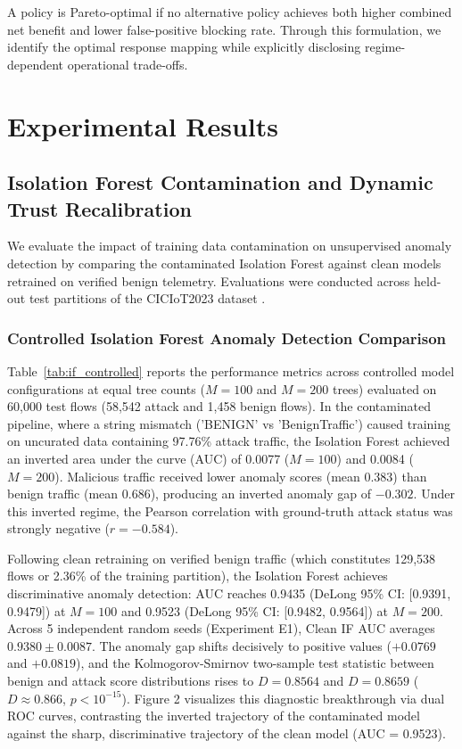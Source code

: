 \documentclass[journal,10pt,onecolumn]{IEEEtran}
\begin{document}
A policy is Pareto-optimal if no alternative policy achieves both higher combined net benefit and lower false-positive blocking rate. Through this formulation, we identify the optimal response mapping while explicitly disclosing regime-dependent operational trade-offs.






\section{Experimental Results}

\subsection{Isolation Forest Contamination and Dynamic Trust Recalibration}
We evaluate the impact of training data contamination on unsupervised anomaly detection by comparing the contaminated Isolation Forest against clean models retrained on verified benign telemetry. Evaluations were conducted across held-out test partitions of the CICIoT2023 dataset \cite{3}.

\subsubsection{Controlled Isolation Forest Anomaly Detection Comparison}
Table~\ref{tab:if_controlled} reports the performance metrics across controlled model configurations at equal tree counts ($M=100$ and $M=200$ trees) evaluated on 60,000 test flows (58,542 attack and 1,458 benign flows). In the contaminated pipeline, where a string mismatch ('BENIGN' vs 'BenignTraffic') caused training on uncurated data containing 97.76\% attack traffic, the Isolation Forest achieved an inverted area under the curve (AUC) of 0.0077 ($M=100$) and 0.0084 ($M=200$). Malicious traffic received lower anomaly scores (mean 0.383) than benign traffic (mean 0.686), producing an inverted anomaly gap of $-0.302$. Under this inverted regime, the Pearson correlation with ground-truth attack status was strongly negative ($r = -0.584$).

Following clean retraining on verified benign traffic (which constitutes 129,538 flows or 2.36\% of the training partition), the Isolation Forest achieves discriminative anomaly detection: AUC reaches 0.9435 (DeLong 95\% CI: [0.9391, 0.9479]) at $M=100$ and 0.9523 (DeLong 95\% CI: [0.9482, 0.9564]) at $M=200$. Across 5 independent random seeds (Experiment E1), Clean IF AUC averages $0.9380 \pm 0.0087$. The anomaly gap shifts decisively to positive values ($+0.0769$ and $+0.0819$), and the Kolmogorov-Smirnov two-sample test statistic between benign and attack score distributions rises to $D = 0.8564$ and $D = 0.8659$ ($D \approx 0.866$, $p < 10^{-15}$). Figure 2 visualizes this diagnostic breakthrough via dual ROC curves, contrasting the inverted trajectory of the contaminated model against the sharp, discriminative trajectory of the clean model (AUC = 0.9523).
\end{document}
